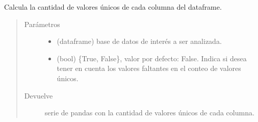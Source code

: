 \documentclass[letterpaper,10pt,openany,spanish]{sphinxmanual}
\begin{document}

\begin{fulllineitems}
\label{\detokenize{datos:datos.unique_col}}
Calcula la cantidad de valores únicos de cada columna del dataframe.
\begin{quote}\begin{description}
\item[{Parámetros}] \leavevmode\begin{itemize}
\item {} 
 \textendash{} (dataframe) base de datos de interés a ser analizada.

\item {} 
 \textendash{} (bool) \{True, False\}, valor por defecto: False. Indica si desea tener en cuenta los valores faltantes en el conteo de valores únicos.

\end{itemize}

\item[{Devuelve}] \leavevmode
serie de pandas con la cantidad de valores únicos de cada columna.

\end{description}\end{quote}

\end{fulllineitems}

\end{document}

